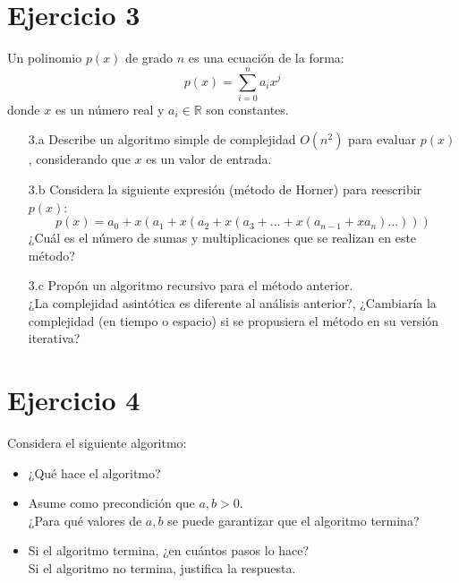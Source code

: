 \documentclass[12pt]{article}
\begin{document}
\section*{Ejercicio 3}
Un polinomio $p(x)$ de grado $n$ es una ecuación de la forma:
\[
    p(x)=\sum_{i=0}^n a_ix^j
\]
donde $x$ es un número real y $a_i \in \mathbb{R}$ son constantes.
\begin{itemize}
    \item[3.a] Describe un algoritmo simple de complejidad $O(n^2)$ para evaluar $p(x)$, considerando que $x$ es un valor de entrada.
    \item[3.b] Considera la siguiente expresión (método de Horner) para reescribir $p(x)$:
    \[
        p(x) = a_0 + x(a_1 + x(a_2 + x(a_3 + . . . + x(a_{n-1} + xa_n). . .)))
    \]
    ¿Cuál es el número de sumas y multiplicaciones que se realizan en este método?
    \item[3.c] Propón un algoritmo recursivo para el método anterior.\\
    ¿La complejidad asintótica es diferente al análisis anterior?, ¿Cambiaría la complejidad (en tiempo o espacio) si se propusiera el método en su versión iterativa?
\end{itemize}

\section*{Ejercicio 4}
Considera el siguiente algoritmo:
\begin{algorithm}
\end{algorithm}
\begin{itemize}
    \item ¿Qué hace el algoritmo?
    \item Asume como precondición que $a, b > 0$.\\
    ¿Para qué valores de $a, b$ se puede garantizar que el algoritmo termina?
    \item Si el algoritmo termina, ¿en cuántos pasos lo hace?\\
    Si el algoritmo no termina, justifica la respuesta.
\end{itemize}

\end{document}
